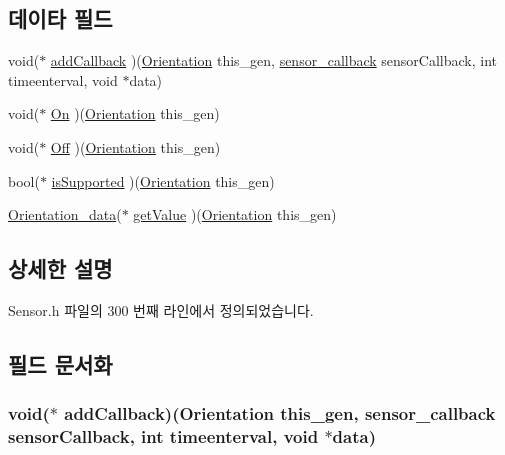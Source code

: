 \subsection*{데이타 필드}
\begin{DoxyCompactItemize}
\item 
void($\ast$ \hyperlink{struct___orientation_abb523be2a4b5a192332e30174ab2ea5d}{add\-Callback} )(\hyperlink{_sensor_8h_a058ad66677a03fd816875edcfc7874ad}{Orientation} this\-\_\-gen, \hyperlink{_sensor_8h_ad8114207845fc5e0aa30832f0c718cd6}{sensor\-\_\-callback} sensor\-Callback, int timeenterval, void $\ast$data)
\item 
void($\ast$ \hyperlink{struct___orientation_a0848f4dbdfe916967953e71304b5b6f2}{On} )(\hyperlink{_sensor_8h_a058ad66677a03fd816875edcfc7874ad}{Orientation} this\-\_\-gen)
\item 
void($\ast$ \hyperlink{struct___orientation_a104eb416cfdd83daabbc5d9793f0cd05}{Off} )(\hyperlink{_sensor_8h_a058ad66677a03fd816875edcfc7874ad}{Orientation} this\-\_\-gen)
\item 
bool($\ast$ \hyperlink{struct___orientation_af272be2847d4987b9107f4f016b573f1}{is\-Supported} )(\hyperlink{_sensor_8h_a058ad66677a03fd816875edcfc7874ad}{Orientation} this\-\_\-gen)
\item 
\hyperlink{_sensor_8h_a7c3785888229956a330934052e67f0bc}{Orientation\-\_\-data}($\ast$ \hyperlink{struct___orientation_abb38457c67d18f412e911e5173d62419}{get\-Value} )(\hyperlink{_sensor_8h_a058ad66677a03fd816875edcfc7874ad}{Orientation} this\-\_\-gen)
\end{DoxyCompactItemize}


\subsection{상세한 설명}


Sensor.\-h 파일의 300 번째 라인에서 정의되었습니다.



\subsection{필드 문서화}
\hypertarget{struct___orientation_abb523be2a4b5a192332e30174ab2ea5d}{
\subsubsection[{add\-Callback}]{\setlength{\rightskip}{0pt plus 5cm}void($\ast$  add\-Callback)({\bf Orientation} this\-\_\-gen, {\bf sensor\-\_\-callback} sensor\-Callback, int timeenterval, void $\ast$data)}}\label{struct___orientation_abb523be2a4b5a192332e30174ab2ea5d}


